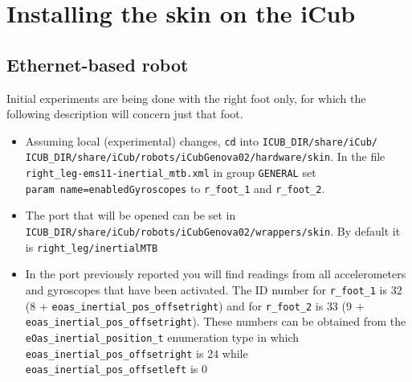 \section{Installing the skin on the iCub}
\subsection{Ethernet-based robot}
Initial experiments are being done with the right foot only, for which the following description will concern just that foot.
\begin{itemize}
  \item Assuming local (experimental) changes, \texttt{cd} into \texttt{ICUB\_DIR/share/iCub/} \texttt{ICUB\_DIR/share/iCub/robots/iCubGenova02/hardware/skin}. In the file \texttt{right\_leg-ems11-inertial\_mtb.xml} in group \texttt{GENERAL} set \\ \texttt{param name=enabledGyroscopes} to \texttt{r\_foot\_1} and \texttt{r\_foot\_2}.\\
  \item The port that will be opened can be set in \texttt{ICUB\_DIR/share/iCub/ro\-bots/iCubGeno\-va02/wrappers/skin}. By default it is \texttt{right\_leg/iner\-tialMTB}
  \item In the port previously reported you will find readings from all accelerometers and gyroscopes that have been activated. The ID number for \texttt{r\_foot\_1} is $32$ (8 + \texttt{eoas\_inertial\_pos\_offsetright}) and for \texttt{r\_foot\_2} is $33$ (9 + \texttt{eoas\_inertial\_pos\_offsetright}). These numbers can be obtained from the \texttt{eOas\_inertial\_position\_t} enumeration type in which \texttt{eoas\_inertial\_pos\_offsetright} is $24$ while \texttt{eoas\_inertial\_pos\_offsetleft} is $0$
\end{itemize}